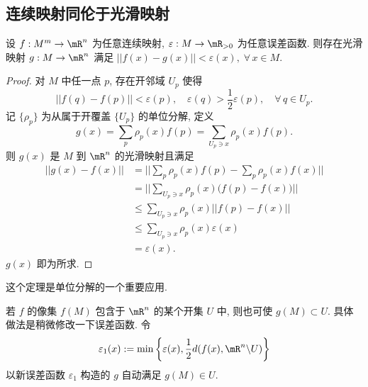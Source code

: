     \subsection{连续映射同伦于光滑映射}
        \begin{theorem}[用光滑映射逼近连续映射]
            设 $f:M^m\rightarrow\mR^n$ 为任意连续映射, 
            $\varepsilon:M\rightarrow\mR_{>0}$ 为任意误差函数.
            则存在光滑映射 $g:M\rightarrow\mR^n$ 满足 
            $||f(x)-g(x)||<\varepsilon(x),\;\forall\,x\in M$.
        \end{theorem}
        \begin{proof}
            对 $M$ 中任一点 $p$, 存在开邻域 $U_p$ 使得 
            \begin{equation*}
                ||f(q)-f(p)||<\varepsilon(p),\quad\varepsilon(q)
                >\frac{1}{2}\varepsilon(p),\quad\forall\,q\in U_p.
            \end{equation*}
            记 $\{\rho_p\}$ 为从属于开覆盖 $\{U_p\}$ 的单位分解, 定义 
            \begin{equation*}
                g(x) = \sum_{p}\rho_p(x)f(p) = \sum_{U_p\ni x}\rho_p(x)f(p).
            \end{equation*}
            则 $g(x)$ 是 $M$ 到 $\mR^n$ 的光滑映射且满足 
            \begin{align*}
                ||g(x)-f(x)|| &= \Big|\Big|\sum_{p}\rho_p(x)f(p) 
                - \sum_{p}\rho_p(x)f(x)\Big|\Big| \\
                &= \Big|\Big|\sum_{U_p\ni x}\rho_p(x)
                \Big(f(p)-f(x)\Big)\Big|\Big| \\
                &\leqslant\sum_{U_p\ni x}\rho_p(x)
                \big|\big|f(p)-f(x)\big|\big| \\
                &\leqslant\sum_{U_p\ni x}\rho_p(x)\varepsilon(x) \\
                &=\varepsilon(x).
            \end{align*}
            $g(x)$ 即为所求.
        \end{proof}
        \begin{remark}
            这个定理是单位分解的一个重要应用.
        \end{remark}
        \begin{remark}
            若 $f$ 的像集 $f(M)$ 包含于 $\mR^n$ 的某个开集 $U$ 中, 
            则也可使 $g(M)\subset U$. 具体做法是稍微修改一下误差函数.
            令 
            \begin{equation*}
                \varepsilon_1(x):=\min\left\{
                    \varepsilon(x),\frac{1}{2}d(f(x),\mR^n\backslash U)
                    \right\}
            \end{equation*} 
            以新误差函数 $\varepsilon_1$ 构造的 $g$ 自动满足 $g(M)\in U$.
        \end{remark}
